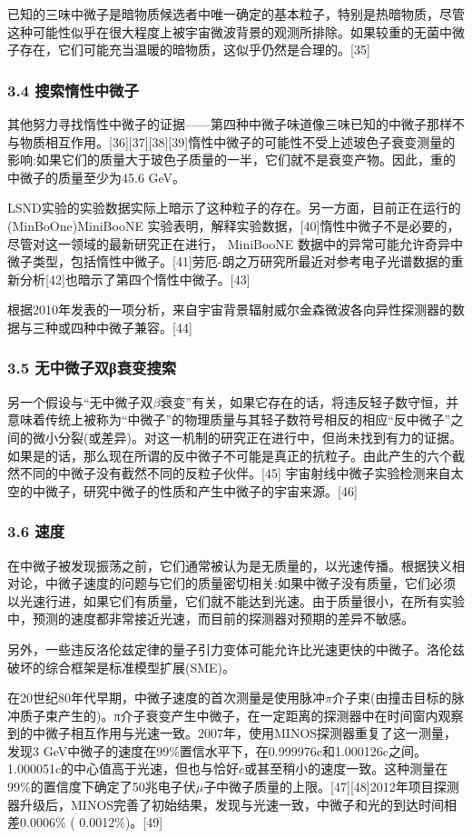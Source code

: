 已知的三味中微子是暗物质候选者中唯一确定的基本粒子，特别是热暗物质，尽管这种可能性似乎在很大程度上被宇宙微波背景的观测所排除。如果较重的无菌中微子存在，它们可能充当温暖的暗物质，这似乎仍然是合理的。[35]

\subsubsection{3.4 搜索惰性中微子}
其他努力寻找惰性中微子的证据——第四种中微子味道像三味已知的中微子那样不与物质相互作用。[36][37][38][39]惰性中微子的可能性不受上述玻色子衰变测量的影响:如果它们的质量大于玻色子质量的一半，它们就不是衰变产物。因此，重的中微子的质量至少为45.6 GeV。

LSND实验的实验数据实际上暗示了这种粒子的存在。另一方面，目前正在运行的 (MinBoOne)MiniBooNE 实验表明，解释实验数据，[40]惰性中微子不是必要的，尽管对这一领域的最新研究正在进行， MiniBooNE 数据中的异常可能允许奇异中微子类型，包括惰性中微子。[41]劳厄-朗之万研究所最近对参考电子光谱数据的重新分析[42]也暗示了第四个惰性中微子。[43]

根据2010年发表的一项分析，来自宇宙背景辐射威尔金森微波各向异性探测器的数据与三种或四种中微子兼容。[44]

\subsubsection{3.5 无中微子双β衰变搜索}
另一个假设与“无中微子双$\beta$衰变”有关，如果它存在的话，将违反轻子数守恒，并意味着传统上被称为“中微子”的物理质量与其轻子数符号相反的相应“反中微子”之间的微小分裂(或差异)。对这一机制的研究正在进行中，但尚未找到有力的证据。如果是的话，那么现在所谓的反中微子不可能是真正的抗粒子。由此产生的六个截然不同的中微子没有截然不同的反粒子伙伴。[45] 宇宙射线中微子实验检测来自太空的中微子，研究中微子的性质和产生中微子的宇宙来源。[46]

\subsubsection{3.6 速度}
在中微子被发现振荡之前，它们通常被认为是无质量的，以光速传播。根据狭义相对论，中微子速度的问题与它们的质量密切相关:如果中微子没有质量，它们必须以光速行进，如果它们有质量，它们就不能达到光速。由于质量很小，在所有实验中，预测的速度都非常接近光速，而目前的探测器对预期的差异不敏感。

另外，一些违反洛伦兹定律的量子引力变体可能允许比光速更快的中微子。洛伦兹破坏的综合框架是标准模型扩展(SME)。

在20世纪80年代早期，中微子速度的首次测量是使用脉冲$\pi$介子束(由撞击目标的脉冲质子束产生的)。π介子衰变产生中微子，在一定距离的探测器中在时间窗内观察到的中微子相互作用与光速一致。2007年，使用MINOS探测器重复了这一测量，发现3 GeV中微子的速度在99\%置信水平下，在0.999976c和1.000126c之间。1.000051c的中心值高于光速，但也与恰好$c$或甚至稍小的速度一致。这种测量在99\%的置信度下确定了50兆电子伏$\mu$子中微子质量的上限。[47][48]2012年项目探测器升级后，MINOS完善了初始结果，发现与光速一致，中微子和光的到达时间相差0.0006\% ( 0.0012\%)。[49]

